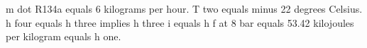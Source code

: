 m dot R134a equals 6 kilograms per hour. T two equals minus 22 degrees Celsius. h four equals h three implies h three i equals h f at 8 bar equals 53.42 kilojoules per kilogram equals h one.